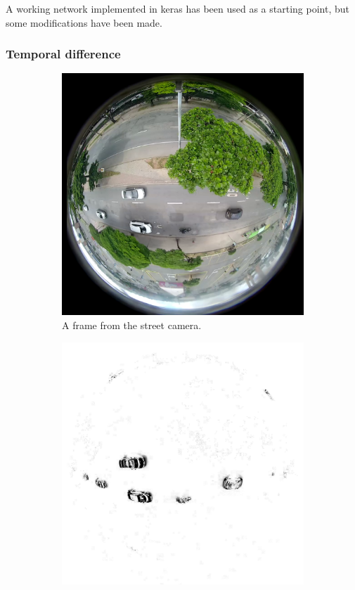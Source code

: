 \documentclass[a4paper,12pt,titlepage, twoside]{article}
\numberwithin{figure}{section}
\begin{document}
A working network implemented in keras\cite{ssd_keras} has been used as a starting point, but some modifications have been made. 

\subsubsection{Temporal difference}

\begin{figure}
    \begin{subfigure}[Sample1]{0.5\linewidth}
    	\includegraphics[width=0.95\linewidth]{fig/stream_frame.png} 
        \caption{A frame from the street camera.}
        \label{fig:td_frame}
    \end{subfigure}
    \quad
    \begin{subfigure}[Sample1]{0.5\linewidth} 
    	\includegraphics[width=0.95\linewidth]{fig/stream_black.png}

\end{subfigure}
\end{figure}
\end{document}
